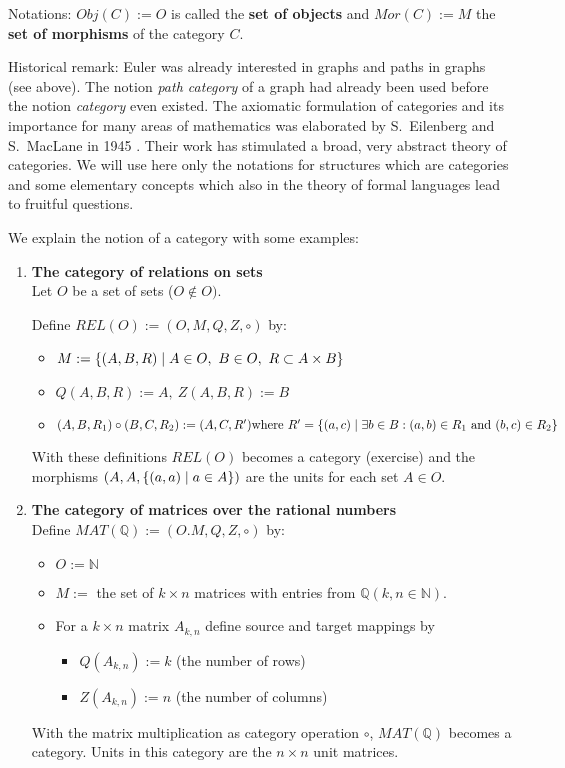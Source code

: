 Notations: $Obj(C) := O$ is called the {\bf set of objects} and $Mor(C) := M$
the {\bf set of morphisms} of the category $C$.

Historical remark: Euler was already interested in graphs and paths in graphs
(see above). The notion {\em path category} of a graph had already been used
before the notion {\em category} even existed. The axiomatic formulation of
categories and its importance for many areas of mathematics was elaborated by
S.\ Eilenberg and S.\ MacLane in 1945 \cite{EiMa}. Their work has stimulated a broad, 
very abstract theory of categories. We will use here only the notations for
structures which are categories and some elementary concepts which also in the theory of formal 
languages lead to fruitful questions.

We explain the notion of a category with some examples:
\begin{enumerate}
  \item {\bf The category of relations on sets} \\
  Let $O$ be a set of sets ($O \notin O)$. 
  
  Define $REL(O) := (O, M, Q, Z,\circ)$ by:
  \begin{itemize}
  	\item $M := \mbox{$\{(A,B,R) \mid A \in O,\ B \in O,\ R \subset A \times B\}$}$
  	\item $Q(A,B,R) := A, \ Z(A,B,R) := B$
  	\item $(A,B,R_1) \circ (B,C,R_2) := (A,C,R')\\
  	\text{where }R'= \mbox{$\{(a,c) \mid \exists b \in B: (a,b)\in R_1\text{ and
  	}(b,c)\in R_2\}$}$
  \end{itemize}
  With these definitions $REL(O)$ becomes a category (exercise) and the
  morphisms $(A, A, \mbox{$\{(a, a) \mid a\in A\}$})$ are the units for each set $A
  \in O$.

  \item {\bf The category of matrices over the rational numbers} \\
  Define $MAT(\mathbb{Q}) := (O. M, Q, Z, \circ)$ by:
  \begin{itemize}
    \item $O := \mathbb{N}$
    \item $M :=$ the set of $k \times n$ matrices with entries from
    $\mathbb{Q} (k, n \in \mathbb{N})$.
    \item For a $k \times n$ matrix $A_{k,n}$ define source and target mappings
    by
    \begin{itemize}
	    \item[] $Q(A_{k,n}) := k$ (the number of rows)
  	  \item[] $Z(A_{k,n}) := n$ (the number of columns)
    \end{itemize}
  \end{itemize}
	With the matrix multiplication as category operation $\circ$, $MAT(\mathbb{Q})$ 
	becomes a category. Units in this category are the $n\times n$ unit matrices.
\end{enumerate}

